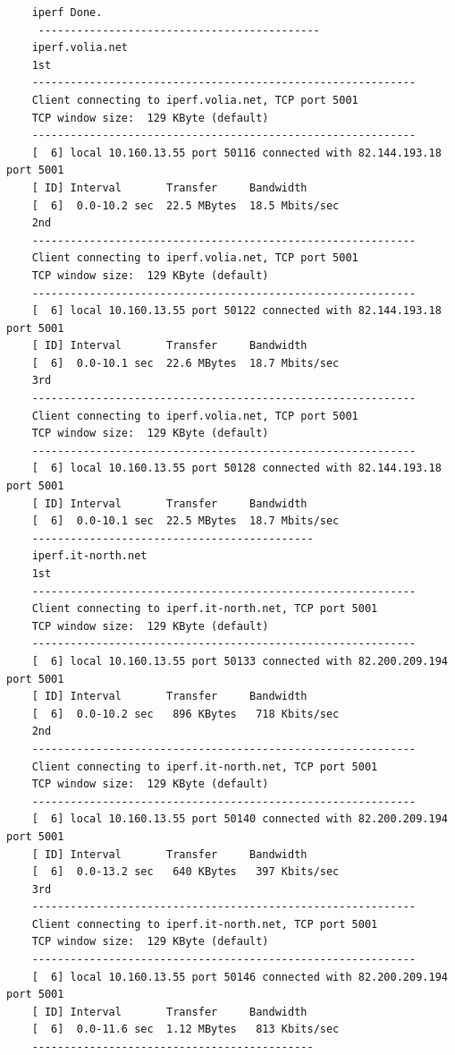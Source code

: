 \documentclass[paper=a4, fontsize=10pt]{scrartcl} %
\numberwithin{equation}{section} %
\numberwithin{figure}{section} %
\numberwithin{table}{section} %
\begin{document}
\begin{lstlisting}
    iperf Done.
     -------------------------------------------- 
    iperf.volia.net
    1st
    ------------------------------------------------------------
    Client connecting to iperf.volia.net, TCP port 5001
    TCP window size:  129 KByte (default)
    ------------------------------------------------------------
    [  6] local 10.160.13.55 port 50116 connected with 82.144.193.18 port 5001
    [ ID] Interval       Transfer     Bandwidth
    [  6]  0.0-10.2 sec  22.5 MBytes  18.5 Mbits/sec
    2nd
    ------------------------------------------------------------
    Client connecting to iperf.volia.net, TCP port 5001
    TCP window size:  129 KByte (default)
    ------------------------------------------------------------
    [  6] local 10.160.13.55 port 50122 connected with 82.144.193.18 port 5001
    [ ID] Interval       Transfer     Bandwidth
    [  6]  0.0-10.1 sec  22.6 MBytes  18.7 Mbits/sec
    3rd
    ------------------------------------------------------------
    Client connecting to iperf.volia.net, TCP port 5001
    TCP window size:  129 KByte (default)
    ------------------------------------------------------------
    [  6] local 10.160.13.55 port 50128 connected with 82.144.193.18 port 5001
    [ ID] Interval       Transfer     Bandwidth
    [  6]  0.0-10.1 sec  22.5 MBytes  18.7 Mbits/sec
    --------------------------------------------
    iperf.it-north.net
    1st
    ------------------------------------------------------------
    Client connecting to iperf.it-north.net, TCP port 5001
    TCP window size:  129 KByte (default)
    ------------------------------------------------------------
    [  6] local 10.160.13.55 port 50133 connected with 82.200.209.194 port 5001
    [ ID] Interval       Transfer     Bandwidth
    [  6]  0.0-10.2 sec   896 KBytes   718 Kbits/sec
    2nd
    ------------------------------------------------------------
    Client connecting to iperf.it-north.net, TCP port 5001
    TCP window size:  129 KByte (default)
    ------------------------------------------------------------
    [  6] local 10.160.13.55 port 50140 connected with 82.200.209.194 port 5001
    [ ID] Interval       Transfer     Bandwidth
    [  6]  0.0-13.2 sec   640 KBytes   397 Kbits/sec
    3rd
    ------------------------------------------------------------
    Client connecting to iperf.it-north.net, TCP port 5001
    TCP window size:  129 KByte (default)
    ------------------------------------------------------------
    [  6] local 10.160.13.55 port 50146 connected with 82.200.209.194 port 5001
    [ ID] Interval       Transfer     Bandwidth
    [  6]  0.0-11.6 sec  1.12 MBytes   813 Kbits/sec
    --------------------------------------------
    
\end{lstlisting}
\end{document}
